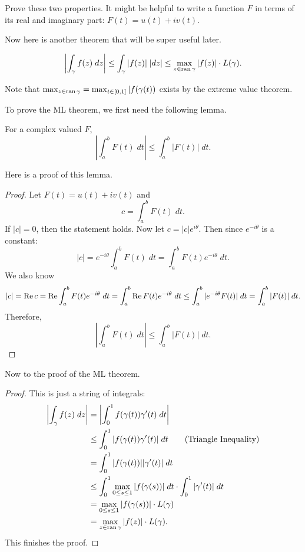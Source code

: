 \begin{exercise}
    Prove these two properties.
    It might be helpful to write a function $F$ in terms of
    its real and imaginary part: $F(t) = u(t) + iv(t)$.
\end{exercise}

Now here is another theorem that will be super useful later.
\begin{theorem}[ML Theorem]
    \[ \left| \int_{\gamma} f(z) \; dz \right| \le
        \int_{\gamma} |f(z)| \; |dz| \le
    \max_{z \in \operatorname{ran}{\gamma}} |f(z)| \cdot L(\gamma). \]
\end{theorem}

Note that $\max_{z \in \operatorname{ran}{\gamma}} = \max_{t \in [0,1]} |f(\gamma(t))$ exists by the extreme value theorem. 

To prove the ML theorem, we first need the following lemma.
\begin{lemma}
    For a complex valued $F$,
    \[ \left| \int_a^b F(t) \; dt \right| \le 
    \int_a^b |F(t)| \; dt. \]
\end{lemma}

Here is a proof of this lemma.
\begin{proof}
    Let $F(t) = u(t) + iv(t)$ and
    \[ c = \int_a^b F(t) \; dt. \]
    If $|c| = 0$, then the statement holds.
    Now let $c = |c| e^{i\theta}$.
    Then since $e^{-i\theta}$ is a constant:
    \[ |c| = e^{-i\theta} \int_a^b F(t) \; dt = \int_a^b 
    F(t)e^{-i\theta} \; dt. \]
    We also know
    \[ |c| = \operatorname{Re}{c} = \operatorname{Re} \int_a^b F(t)e^{-i\theta} \; dt
        = \int_a^b \operatorname{Re}{F(t) e^{-i\theta}} \; dt
        \le \int_a^b |e^{-i\theta} F(t)| \; dt 
    = \int_a^b |F(t)| \; dt. \]
    Therefore,
    \[ \left| \int_a^b F(t) \; dt \right| \le 
    \int_a^b |F(t)| \; dt. \]

\end{proof}

Now to the proof of the ML theorem.
\begin{proof}
    This is just a string of integrals:
    \begin{align*}
        \left| \int_{\gamma} f(z) \; dz \right| &= 
        \left| \int_0^1 f(\gamma(t))\gamma'(t) \; dt \right| \\
        &\le \int_0^1 |f(\gamma(t))\gamma'(t)| \; dt 
        \tag{Triangle Inequality} \\
        &= \int_0^1 |f(\gamma(t))| |\gamma'(t)| \; dt \\
        &\le \int_0^1 \max_{0 \le s \le 1} |f(\gamma(s))| \; dt
        \cdot \int_0^1 |\gamma'(t)| \; dt \\
        &= \max_{0 \le s \le 1} |f(\gamma(s))| \cdot L(\gamma) \\
        &= \max_{z \in \operatorname{ran}{\gamma}} |f(z)| \cdot L(\gamma).
    \end{align*}
    This finishes the proof.
\end{proof}

